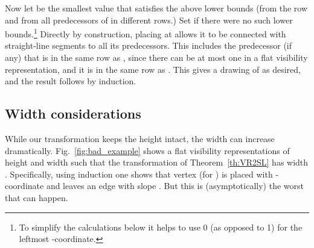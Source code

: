 \documentclass{elsarticle}
\newenvironment{proof}{{\bf Proof: }}{\hspace*{\fill}\medskip}
\begin{document}
\begin{proof}
Now let  be the smallest value that satisfies the above lower
bounds (from the row  and from all predecessors of  in
different rows.)  Set  if there were no such lower bounds.\footnote{To simplify the calculations below it helps to use 0 (as
opposed to 1) for the leftmost -coordinate.}
Directly by construction, placing  at
 allows it to be connected with straight-line segments
to all its predecessors.  This includes the predecessor (if any)
that is in the same row as , since there can be at most one in a flat
visibility representation, and it is in the same row as .
This gives a drawing  of  as
desired, and the result follows by induction.
\end{proof}

\subsection{Width considerations}

While our transformation keeps the height intact,
the width can increase dramatically.  
Fig.~\ref{fig:bad_example} shows a flat visibility representations of 
height  and width  
such that the transformation of Theorem~\ref{th:VR2SL} 
has width .
Specifically, using induction one shows that vertex  (for
) is placed
with -coordinate   and leaves an 
edge with slope .
But this is (asymptotically) the
worst that can happen.  
\end{document}
